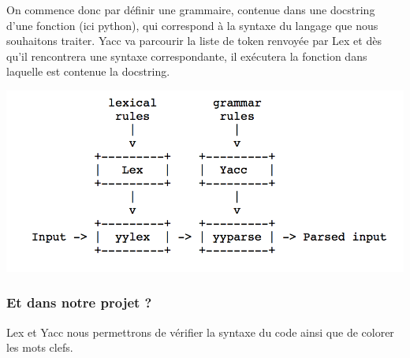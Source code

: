 \documentclass[a4paper,12pt]{article}
\begin{document}
			On commence donc par définir une grammaire, contenue dans une docstring d'une fonction (ici python), qui correspond à 				la syntaxe du langage que nous souhaitons traiter. Yacc va parcourir la liste de token renvoyée par Lex et dès qu'il 				rencontrera une syntaxe correspondante, il exécutera la fonction dans laquelle est contenue la docstring. 
			\vspace{0.5cm}
			\begin{center}
				\includegraphics[scale=0.6]{images/schema_lex_yacc.png}
			\end{center}

		\subsubsection{Et dans notre projet ?}

			Lex et Yacc nous permettrons de vérifier la syntaxe du code ainsi que de colorer les mots clefs.			
			
\end{document}
